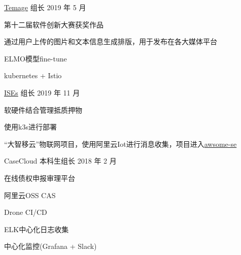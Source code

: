 

\begin{cventries}

  \cventry
    {} %
    {\href{https://github.com/wangtianxia-sjtu/Temage}{Temage}} %
    {组长} %
    {2019 年 5 月} %
    {
      \begin{cvitems} %
        \item 第十二届软件创新大赛获奖作品
        \item 通过用户上传的图片和文本信息生成排版，用于发布在各大媒体平台
        \item ELMO模型fine-tune
        \item kubernetes + Istio
      \end{cvitems}
    }

  \cventry
    {} %
    {\href{https://github.com/tx19980520/ISEs}{ISEs}} %
    {组长} %
    {2019 年 11 月} %
    {
      \begin{cvitems} %
        \item 软硬件结合管理抵质押物
        \item 使用k3s进行部署
        \item “大智移云”物联网项目，使用阿里云Iot进行消息收集，项目进入\href{https://github.com/SJTU-SE/awesome-se}{awsome-se}
      \end{cvitems}
    }

  \cventry
    {} %
    {CaseCloud} %
    {本科生组长} %
    {2018 年 2 月} %
    {
      \begin{cvitems} %
        \item 在线债权申报审理平台
        \item 阿里云OSS CAS
        \item Drone CI/CD
        \item ELK中心化日志收集
        \item 中心化监控(Grafana + Slack)
      \end{cvitems}
    }


\end{cventries}
